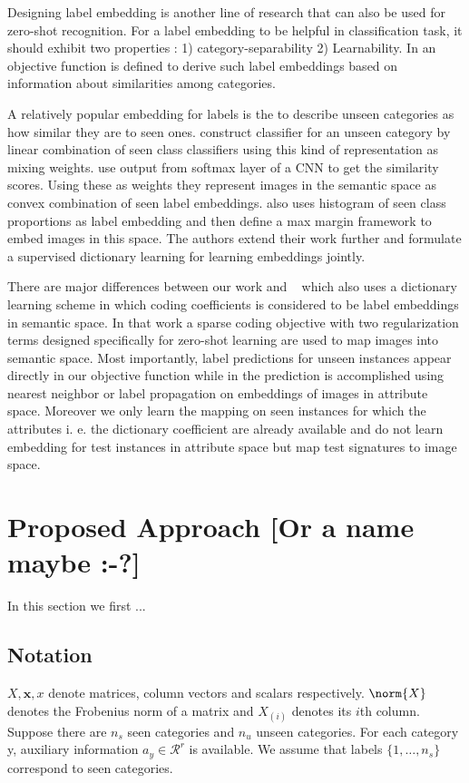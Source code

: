  Designing label embedding is another line of research that can also be used for zero-shot recognition. For a label embedding to be helpful in classification task,
 it should exhibit two properties \cite{Yu2013}: 1) category-separability 2) Learnability. In \cite{Yu2013} an objective function is defined to derive
 such label embeddings based on information about similarities among categories.

A relatively popular embedding for labels is the to describe unseen categories as how similar they are to seen ones.
\cite{costa} construct  classifier for an unseen category by linear combination of seen class classifiers
using this kind of representation as mixing weights. \cite{convex} use output from softmax layer of a CNN to get the similarity scores.
Using these as weights they represent images in the semantic space as convex combination of seen label embeddings.
\cite{sse} also uses histogram of seen class proportions as label embedding and then define a max margin framework to embed images
 in this space. The authors extend their work further \cite{agnostic} and formulate a supervised dictionary learning
 for learning embeddings jointly.


There are major differences between our work and  ~\cite{Kodirov2015} which also uses a dictionary learning scheme in which coding coefficients is considered to be
 label embeddings in semantic space. In that work a sparse coding objective with two regularization terms designed specifically for
 zero-shot learning are used to map images into semantic space. Most importantly, label predictions
 for unseen instances appear directly in our objective function while in \cite{Kodirov2015} the prediction is accomplished using
 nearest neighbor or label propagation on embeddings of images in attribute space. Moreover we only learn the mapping
 on seen instances for which the attributes i. e. the dictionary coefficient are already available and
 do not learn embedding for test instances in attribute space but map test signatures to image space.

\section{Proposed Approach [Or a name maybe :-?]} \label{proposed}
In this section we first ...


\subsection{Notation}
$X, \mathbf{x}, x$ denote matrices, column vectors and scalars respectively. $\norm{X}$ denotes the Frobenius norm of a matrix and
$X_{(i)}$ denotes its $i$th column.
Suppose there are $n_s$ seen categories and $n_u$ unseen categories. For each category y,
auxiliary information $a_y \in \mathcal{R}^r$ is available. We assume that labels $\{1, \ldots, n_s \}$
correspond to seen categories.

